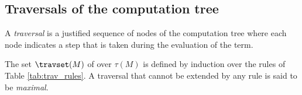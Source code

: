 \subsection{Traversals of the computation tree}
\label{subsec:traversal}

A \emph{traversal} is a justified sequence of nodes of the computation tree where each node
indicates a step that is taken during the evaluation of the term.

\begin{definition} \rm
\label{def:traversal} The set $\travset(M)$ of 
over $\tau(M)$ is defined by induction over the rules of Table
\ref{tab:trav_rules}. A traversal that cannot be extended by any
rule is said to be \emph{maximal}.
\end{definition}
